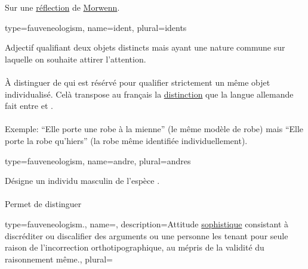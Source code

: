 {{  Sur une \href{https://french.stackexchange.com/questions/8416/mot-générique-pour-désigner-larrêt-de-la-capacité-à-se-reproduire/8424\#8424}{réflection} de \href{https://french.stackexchange.com/users/1328/morwenn}{Morwenn}.
}

{
  type=fauveneologism,
    name={ident},
    plural={idents}
}
{
  Adjectif qualifiant deux objets distincts mais ayant une nature commune sur laquelle on souhaite attirer l’attention.

  \paragraph{}
  À distinguer de  qui est résérvé pour qualifier strictement un même objet individualisé. Celà transpose au français la \href{http://www.arte.tv/fr/le-mot-le-meme/7367656,CmC=7367734.html}{distinction} que la langue allemande fait entre  et .

  \paragraph{}
  Exemple: \enquote{Elle porte une robe  à la mienne} (le même modèle de robe) mais \enquote{Elle porte la  robe qu’hiers} (la robe même identifiée individuellement).
}

{
  type=fauveneologism,
    name={andre},
    plural={andres}
}
{
  Désigne un individu masculin de l’espèce \href{https://fr.wikipedia.org/wiki/Homo\_sapiens}{}.

  \paragraph{}
  Permet de distinguer 

{
  type=fauveneologism.,
    name={},
    description={Attitude \href{https://fr.wikipedia.org/wiki/Sophisme}{sophistique} consistant à discréditer ou discalifier des arguments ou une personne les tenant pour seule raison de l’incorrection orthotipographique, au mépris de la validité du raisonnement même.},
    plural={}
}

}}

